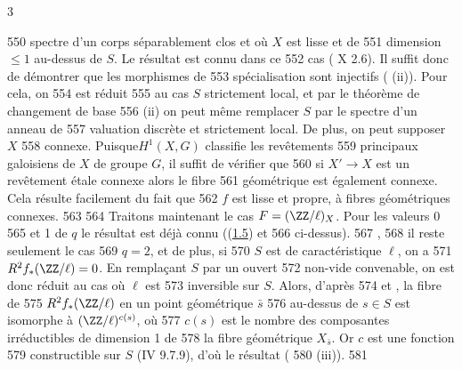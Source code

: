 3	\documentclass[10pt]{../fichiers-configuration-latex/smfart}
\begin{document}
   550	spectre d'un corps séparablement clos et où $X$ est lisse et de
   551	dimension $\leq 1$ au-dessus de $S$. Le résultat est connu dans ce
   552	cas ( X 2.6). Il suffit donc de démontrer que les morphismes de
   553	spécialisation sont injectifs ( (ii)). Pour cela, on
   554	est réduit 
   555	au cas $S$ strictement local, et par le théorème de changement de base
   556	 (ii) on peut même remplacer $S$ par le spectre d'un anneau de
   557	valuation discrète et strictement local. De plus, on peut supposer $X$
   558	connexe. Puisque\pageoriginale $H^{1}(X,G)$ classifie les revêtements
   559	principaux galoisiens de $X$ de groupe $G$, il suffit de vérifier que
   560	si $X'\rightarrow X$ est un revêtement étale connexe alors le fibre
   561	géométrique est également connexe. Cela résulte facilement du fait que
   562	$f$ est lisse et propre, à fibres géométriques connexes.
   563	
   564	Traitons maintenant le cas $F=(\ZZ/\ell)_X$. Pour les valeurs 0
   565	et 1 de $q$ le résultat est déjà connu ((\hyperref[XIV.lem1.5]{1.5}) et
   566	ci-dessus).  
   567	 , 
   568	il reste seulement le cas
   569	$q=2$, et de plus, si 
   570	$S$ est de caractéristique $\ell$, on a
   571	$R^{2}f_{\ast}(\ZZ/\ell)=0$. En remplaçant $S$ par un ouvert
   572	non-vide convenable, on est donc réduit au cas où $\ell$ est
   573	inversible sur $S$. Alors, d'après   
   574	et , la fibre de
   575	$R^{2}f_{\ast}(\ZZ/\ell)$ en un point géométrique $\bar{s}$
   576	au-dessus de $s \in S$ est isomorphe à $(\ZZ/\ell)^{c(s)}$, où
   577	$c(s)$ est le nombre des composantes irréductibles de dimension 1 de
   578	la fibre géométrique $X_{\bar{s}}$. Or $c$ est une fonction
   579	constructible sur $S$ (\EGA IV 9.7.9), d'où le résultat (
   580	(iii)).
   581	
\end{document}
